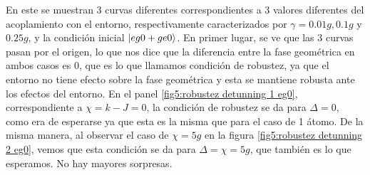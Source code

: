 En este se muestran 3 curvas diferentes correspondientes a 3 valores diferentes del acoplamiento con el entorno, respectivamente caracterizados por $\gamma=0.01g,0.1g$ y $0.25g$, y la condición inicial $\ket{eg0+ge0}$. En primer lugar, se ve que las 3 curvas pasan por el origen, lo que nos dice que la diferencia entre la fase geométrica en ambos casos es 0, que es lo que llamamos condición de robustez, ya que el entorno no tiene efecto sobre la fase geométrica y esta se mantiene robusta ante los efectos del entorno. En el panel \ref{fig5:robustez detunning 1 eg0}, correspondiente a $\chi=k-J=0$, la condición de robustez se da para $\Delta=0$, como era de esperarse ya que esta es la misma que para el caso de 1 átomo. De la misma manera, al observar el caso de $\chi=5g$ en la figura \ref{fig5:robustez detunning 2 eg0}, vemos que esta condición se da para $\Delta=\chi=5g$, que también es lo que esperamos. No hay mayores sorpresas. 

